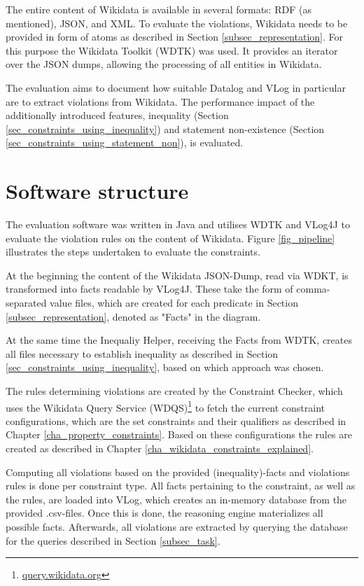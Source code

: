 \documentclass[hyperref,bachelorofscience,fleqn]{cgvpub}
\begin{document}
The entire content of Wikidata is available in several formats: RDF (as mentioned), JSON, and XML. To evaluate the violations, Wikidata needs to be provided in form of atoms as described in 
Section \ref{subsec_representation}. For this purpose the Wikidata Toolkit (WDTK)\cite{wdtk} was used. It provides an iterator over the JSON dumps, allowing the processing of all entities in Wikidata.

The evaluation aims to document how suitable Datalog and VLog in particular are to extract violations from Wikidata. The performance impact of the additionally introduced features, inequality (Section \ref{sec_constraints_using_inequality}) and statement non-existence (Section \ref{sec_constraints_using_statement_non}), is evaluated.

\section{Software structure}
The evaluation software\cite{wcd} was written in Java and utilises WDTK and VLog4J to evaluate the violation rules on the content of Wikidata. Figure \ref{fig_pipeline} illustrates the steps undertaken to evaluate the constraints.

At the beginning the content of the Wikidata JSON-Dump, read via WDKT, is transformed into facts readable by VLog4J. These take the form of comma-separated value files, which are created for each predicate in Section \ref{subsec_representation}, denoted as "Facts" in the diagram.

At the same time the Inequaliy Helper, receiving the Facts from WDTK, creates all files necessary to establish inequality as described in Section \ref{sec_constraints_using_inequality}, based on which approach was chosen.

The rules determining violations are created by the Constraint Checker, which uses the Wikidata Query Service (WDQS)\footnote{\url{query.wikidata.org}} to fetch the current constraint configurations, which are the set constraints and their qualifiers as described in Chapter \ref{cha_property_constraints}. Based on these configurations the rules are created as described in Chapter \ref{cha_wikidata_constraints_explained}.

Computing all violations based on the provided (inequality)-facts and violations rules is done per constraint type. All facts pertaining to the constraint, as well as the rules, are loaded into VLog, which creates an in-memory database from the provided .csv-files. Once this is done, the reasoning engine materializes all possible facts. Afterwards, all violations are extracted by querying the database for the queries described in Section \ref{subsec_task}.
\end{document}
